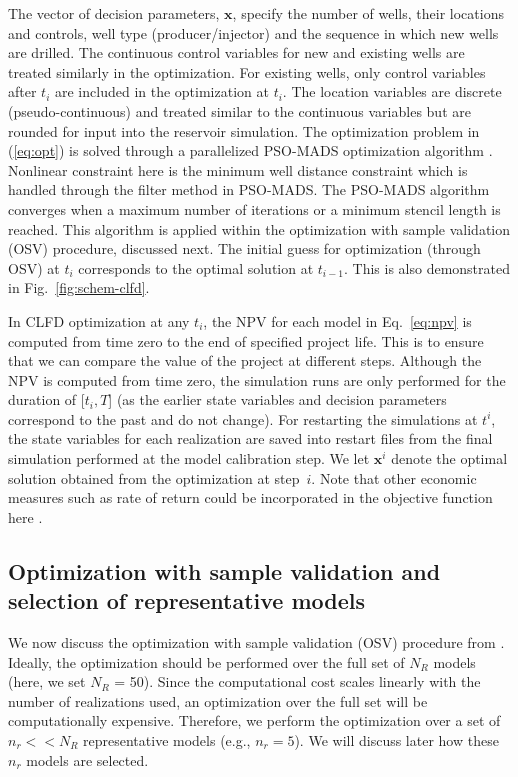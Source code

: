 \documentclass[11pt]{article}
\begin{document}
The vector of decision parameters, $\mathbf{x}$, specify
the number of wells, their locations and controls, well type (producer/injector) and the sequence in which new wells are drilled.
The continuous control variables for new and existing wells are treated similarly in the optimization.
For existing wells, only control variables after $t_i$ are included in the optimization at $t_i$.
The location variables are discrete (pseudo-continuous) and treated similar to the continuous variables
but are rounded for input into the reservoir simulation.
The optimization problem in (\ref{eq:opt}) is solved through a parallelized PSO-MADS optimization algorithm \citep{isebor:14b}.
Nonlinear constraint here is the minimum well distance constraint which is handled through the filter method in PSO-MADS.
The PSO-MADS algorithm converges when a maximum number of iterations or a minimum stencil length is reached.
This algorithm is applied within the optimization with sample validation (OSV) procedure, discussed next. 
The initial guess for optimization (through OSV) at $t_i$ corresponds to the optimal solution at $t_{i-1}$.
This is also demonstrated in Fig.~\ref{fig:schem-clfd}.

In CLFD optimization at any $t_i$, the NPV for each model in Eq.~\ref{eq:npv}
is computed from time zero to the end of specified project life.
This is to ensure that we can compare the value of the project at different steps.
Although the NPV is computed from time zero, the simulation runs are only performed for the duration of [$t_i, T$] (as the earlier state variables and decision parameters correspond to the past and do not change).
For restarting the simulations at $t^i$, the state variables for each realization are saved into restart files from the final simulation performed at the model calibration step.
We let $\mathbf{x}^{i}$ denote the optimal solution obtained from the optimization at step~$i$.
Note that other economic measures such as rate of return could be incorporated in the objective function here \citep{shirangi:17b}.

\subsection{Optimization with sample validation and selection of representative models} \label{opt-robust}
We now discuss the optimization with sample validation (OSV) procedure from \citet{shirangi:15b}.
Ideally, the optimization should be performed over the full set of $N_R$ models (here, we set $N_R$ = 50).
Since the computational cost scales linearly with the number of realizations used,
an optimization over the full set will be computationally expensive.
Therefore, we perform the optimization over a set of $n_r << N_R$ representative models (e.g., $n_r=5$).
We will discuss later how these $n_r$ models are selected.
\end{document}
